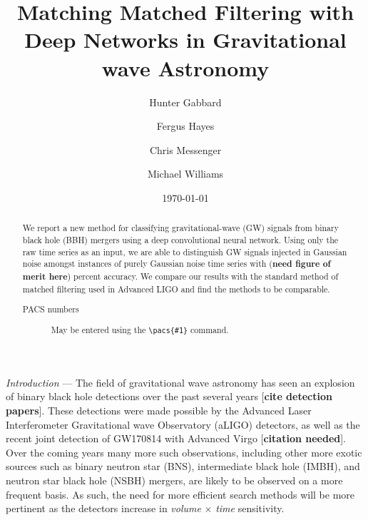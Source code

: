 \documentclass[%
 amsmath,amssymb,
 aps,
 twocolumn,
floatfix,
]{revtex4-1}
\begin{document}

\title{Matching Matched Filtering with Deep Networks in Gravitational wave Astronomy}%

\author{Hunter Gabbard}%
\author{Fergus Hayes}
\author{Chris Messenger}
\author{Michael Williams}

\date{\today}%

\begin{abstract}
 We report a new method for classifying gravitational-wave (GW) signals from binary black hole (BBH) mergers using a deep convolutional neural network. Using only the raw time series as an input, we are able to distinguish GW signals injected in Gaussian noise amongst instances of purely Gaussian noise time series with (\textbf{need figure of merit here}) percent accuracy. We compare our results with the standard method of matched filtering used in Advanced LIGO and find the methods to be comparable.  
\begin{description}
\item[PACS numbers]
May be entered using the \verb+\pacs{#1}+ command.
\end{description}
\end{abstract}

\maketitle




\textit{Introduction} --- The field of gravitational wave astronomy has seen an explosion of binary black hole detections over the past several years [\textbf{cite detection papers}]. These detections were made possible by the Advanced Laser Interferometer Gravitational wave Observatory (aLIGO) detectors, as well as the recent joint detection of GW170814 with Advanced Virgo [\textbf{citation needed}]. Over the coming years many more such observations, including other more exotic sources such as binary neutron star (BNS), intermediate black hole (IMBH), and neutron star black hole (NSBH) mergers, are likely to be observed on a more frequent basis. As such, the need for more efficient search methods will be more pertinent as the detectors increase in \textit{volume} $\times$ \textit{time} sensitivity.
\end{document}
